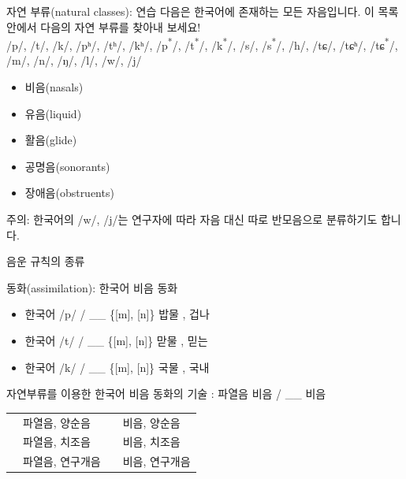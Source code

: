 \documentclass[11pt, aspectratio=169]{beamer}
\newcommand{\textds}[1]{{\ipafont #1}}
\begin{document}
\begin{frame}[t]{자연 부류(natural classes): 연습}
    다음은 한국어에 존재하는 모든 자음입니다. 이 목록 안에서 다음의 자연 부류를 찾아내 보세요! \\
    {\textds{/p/, /t/, /k/, /pʰ/, /tʰ/, /kʰ/, /p\textsuperscript{*}/, /t\textsuperscript{*}/, /k\textsuperscript{*}/, /s/, /s\textsuperscript{*}/, /h/, /tɕ/, /tɕʰ/, /tɕ\textsuperscript{*}/, /m/, /n/, /ŋ/, /l/, /w/, /j/}}
    \vspace{0.3cm}
    \begin{itemize}
        \item 비음(nasals) %
        \item 유음(liquid) %
        \item 활음(glide) %
        \item 공명음(sonorants) %
        \item 장애음(obstruents) %
    \end{itemize}
    \vspace{0.3cm}
    {\small 주의: 한국어의 /w/, /j/는 연구자에 따라 자음 대신 따로 반모음으로 분류하기도 합니다.}
\end{frame}

\begin{frame}[t]{음운 규칙의 종류}
    \begin{block}{동화(assimilation): 한국어 비음 동화}
        \begin{itemize}
            \item 한국어 \textds{/p/} \rightarrow \textds{[m]} / \_\_ \textds{\{[m], [n]\}} 밥물 \textds{[pammul]}, 겁나 \textds{[kʌmnɑ]}
            \item 한국어 \textds{/t/} \rightarrow \textds{[n]} / \_\_ \textds{\{[m], [n]\}} 맏물 \textds{[mɑnmul]}, 믿는 \textds{[minnɯn]}
            \item 한국어 \textds{/k/} \rightarrow \textds{[ŋ]} / \_\_ \textds{\{[m], [n]\}} 국물 \textds{[kuŋmul]}, 국내 \textds{[kuŋnæ]}
        \end{itemize}
    \end{block}
    \begin{block}{{자연부류를 이용한 한국어 비음 동화의 기술 : 파열음 \rightarrow 비음 / \_\_ 비음}}
        \begin{tabular}{llll}
            \textds{[p]} & 파열음, 양순음 & \textds{[m]} & 비음, 양순음 \\
            \textds{[t]} & 파열음, 치조음 & \textds{[n]} & 비음, 치조음 \\
            \textds{[k]} & 파열음, 연구개음 & \textds{[ŋ]} & 비음, 연구개음 \\
        \end{tabular}        
    \end{block}
\end{frame}
\end{document}
